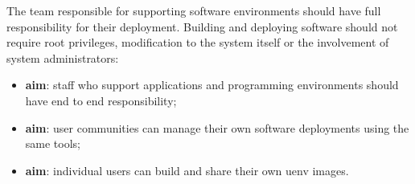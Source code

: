 The team responsible for supporting software environments should have full responsibility for their deployment.
Building and deploying software should not require root privileges, modification to the system itself or the involvement of system administrators:
\begin{itemize}
    \item \textbf{aim}: staff who support applications and programming environments should have end to end responsibility;
    \item \textbf{aim}: user communities can manage their own software deployments using the same tools;
    \item \textbf{aim}: individual users can build and share their own uenv images.
\end{itemize}
